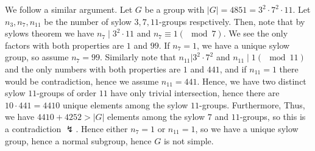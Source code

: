 \documentclass[a4paper]{article}
\begin{document}
\begin{solution}
	We follow a similar argument. Let \(G\) be a group with \(\left| G \right|  = 4851 = 3^2 \cdot 7 ^2 \cdot 11\). Let \(n_3, n_7, n_{11}\) be the number of sylow \(3, 7, 11\)-groups respctively. Then, note that by sylows theorem we have \(n_7 \mid 3^2 \cdot 11\) and \(n_7 \equiv 1 \left( \mod 7 \right) \). We see the only factors with both properties are \(1\) and \(99\). If \(n_7 = 1\), we have a unique sylow group, so assume \(n_7 = 99\). Similarly note that \(n_{11} | 3^2 \cdot 7 ^2\) and \(n_{11} \mid 1 \left( \mod 11 \right) \) and the only numbers with both properties are \(1\) and \(441\), and if \(n_{11} = 1\) there would be contradiction, hence we assume \(n_{11} = 441.\)  Hence, we have two distinct sylow \(11\)-groups of order \(11\) have only trivial intersection, hence there are \(10 \cdot 441 = 4410\) unique elements among the sylow \(11\)-groups. Furthermore,  Thus, we have \(4410 + 4252 > \left| G \right| \) elements among  the sylow \(7\) and \(11\)-groups, so this is a contradiction \(\lightning\). Hence either \(n_7=1\) or \(n_{11} = 1\), so we have a unique sylow group, hence a normal subgroup, hence \(G\) is not simple.
\end{solution}
\end{document}
